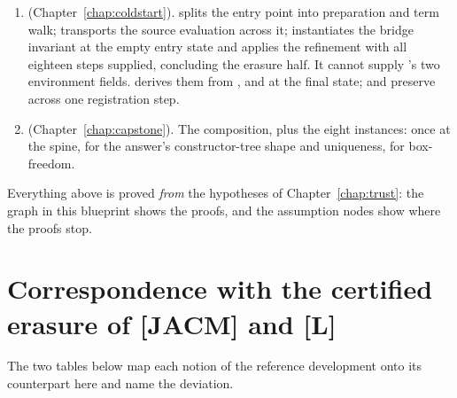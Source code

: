 \begin{enumerate}
composite  --- the analogue of [JACM]'s  and [L, Lemma 11]. One
eighteen-motive fixpoint induction whose steps the capstone supplies as proved terms. A second
eighteen-motive bundle (, , --,
) threads $\Gamma_{\mathrm{spec}}$ as an accumulator; it is off the
capstone's proof path.
\item {} (Chapter~\ref{chap:coldstart}).  splits the
entry point into preparation and term walk;  transports the source evaluation
across it;  instantiates the bridge invariant at the empty entry
state and applies the refinement with all eighteen steps supplied, concluding the erasure half. It
cannot supply 's two environment fields. 
derives them from ,  and  at the final state;
 and  preserve  across one
registration step.
\item {} (Chapter~\ref{chap:capstone}). The composition, plus the eight
instances:  once at the spine,  for the
answer's constructor-tree shape and uniqueness,  for box-freedom.
\end{enumerate}

Everything above is proved \emph{from} the hypotheses of Chapter~\ref{chap:trust}: the graph in this
blueprint shows the proofs, and the assumption nodes show where the proofs stop.

\section{Correspondence with the certified erasure of [JACM] and [L]}
\label{sec:intro:correspondence}

The two tables below map each notion of the reference development onto its counterpart here and name
the deviation.

